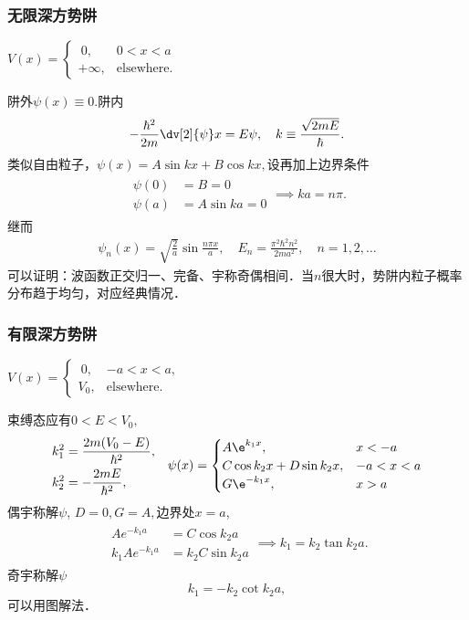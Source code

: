 \subsubsection*{无限深方势阱}
\begin{center}
	$V(x)=\begin{cases}
			~0,      & 0<x<a             \\
			+\infty, & \text{elsewhere.}
		\end{cases}$
\end{center}
阱外$\psi(x)\equiv 0.$阱内
\[
	-\frac{\hbar^2}{2m}\dv[2]{\psi}x=E\psi,\quad k\equiv\frac{\sqrt{2mE}}\hbar.
\]
类似自由粒子，$\psi(x)=A\sin kx+B\cos kx,$设再加上边界条件
\begin{align*}
	\begin{aligned}
		\psi(0)&=B=0 \\
		\psi(a)&=A\sin ka=0
	\end{aligned}
	\implies ka=n\pi.
\end{align*}
继而
\begin{align}
	\psi_n(x)=\sqrt{\frac2a}\sin\frac{n\pi x}a,\quad E_n=\frac{\pi^2\hbar^2n^2}{2ma^2},\quad n=1,2,\ldots
\end{align}
可以证明：波函数正交归一、完备、宇称奇偶相间．当$n$很大时，势阱内粒子概率分布趋于均匀，对应经典情况．

\subsubsection*{有限深方势阱}
\begin{center}
	$V(x)=\begin{cases}
			~0,  & -a<x<a,           \\
			V_0, & \text{elsewhere.}
		\end{cases}$
\end{center}
束缚态应有$0<E<V_0,$
\begin{align*}
	\begin{aligned}
		k_1^2 & =\frac{2m(V_0-E)}{\hbar^2}, \\
		k_2^2 & =-\frac{2mE}{\hbar^2},
	\end{aligned}\quad
	\psi(x)=\begin{cases}
		A\e^{k_1x},             & x<-a   \\
		C\cos k_2x+D\sin k_2x, & -a<x<a \\
		G\e^{-k_1x},            & x>a
	\end{cases}
\end{align*}
偶宇称解$\psi$, $D=0,G=A,$边界处$x=a$,
\begin{align*}
	\begin{aligned}
		Ae^{-k_1a}    & =C\cos k_2a    \\
		k_1Ae^{-k_1a} & =k_2C\sin k_2a
	\end{aligned}
	\implies
	k_1=k_2\tan k_2a.
\end{align*}
奇宇称解$\psi$
\[
	k_1=-k_2\cot k_2a,
\]
可以用图解法．

